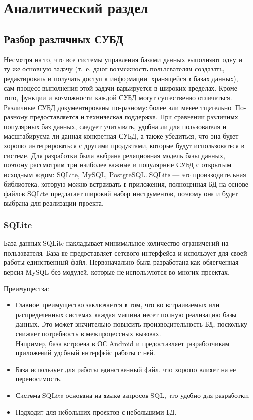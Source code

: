 \chapter{Аналитический раздел}

\section{Разбор различных СУБД}

Несмотря на то, что все системы управления базами данных выполняют одну и ту же основную задачу (т.~е. дают возможность пользователям создавать, редактировать и получать доступ к информации, хранящейся в базах данных), сам процесс выполнения этой задачи варьируется в широких пределах.
Кроме того, функции и возможности каждой СУБД могут существенно отличаться.
Различные СУБД документированы по-разному: более или менее тщательно.
По-разному предоставляется и техническая поддержка.
При сравнении различных популярных баз данных, следует учитывать, удобна ли для пользователя и масштабируема ли данная конкретная СУБД, а также убедиться, что она будет хорошо интегрироваться с другими продуктами, которые будут использоваться в системе.
Для разработки была выбрана реляционная модель базы данных, поэтому рассмотрим три наиболее важные и популярные СУБД с открытым исходным кодом: SQLite, MySQL, PostgreSQL.
SQLite — это производительная библиотека, которую можно встраивать в приложения, полноценная БД на основе файлов SQLite предлагает широкий набор инструментов, поэтому она и будет выбрана для реализации проекта.

\subsection{SQLite}

База данных SQLite накладывает минимальное количество ограничений на пользователя.
База не предоставляет сетевого интерфейса и использует для своей работы единственный файл.
Первоначально была разработана как облегченная версия MySQL без модулей, которые не используются во многих проектах.

Преимущества:
\begin{itemize}
	\item Главное преимущество заключается в том, что во встраиваемых или распределенных системах каждая машина несет полную реализацию базы данных.
	Это может значительно повысить производительность БД, поскольку снижает потребность в межпроцессных вызовах.\\
	Например, база встроена в ОС Android и предоставляет разработчикам приложений удобный интерфейс работы с ней.
	\item База использует для работы единственный файл, что хорошо влияет на ее переносимость.
	\item Система SQLite основана на языке запросов SQL, что удобно для разработки.
	\item Подходит для небольших проектов с небольшими БД.
\end{itemize}

